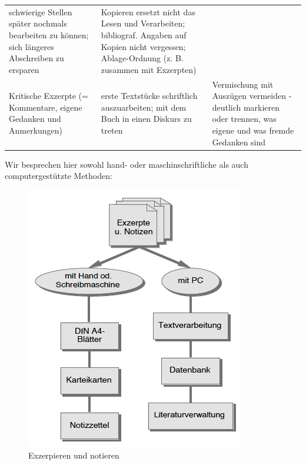 \documentclass[]{book}
\theoremstyle{definition}
\theoremstyle{definition}
\theoremstyle{definition}
\theoremstyle{remark}
\begin{document}
\begin{longtable}[]{@{}lll@{}}
\begin{minipage}[t]{0.27\columnwidth}
schwierige Stellen später nochmals bearbeiten zu können; sich längeres
Abschreiben zu ersparen \vspace{5mm}\strut
\end{minipage} & \begin{minipage}[t]{0.33\columnwidth}\raggedright\strut
Kopieren ersetzt nicht das Lesen und Verarbeiten; bibliograf. Angaben
auf Kopien nicht vergessen; Ablage-Ordnung (z. B. zusammen mit
Exzerpten) \vspace{5mm}\strut
\end{minipage}\tabularnewline
\begin{minipage}[t]{0.31\columnwidth}\raggedright\strut
Kritische Exzerpte (= Kommentare, eigene Gedanken und Anmerkungen)\strut
\end{minipage} & \begin{minipage}[t]{0.27\columnwidth}\raggedright\strut
erste Textstücke schriftlich auszuarbeiten; mit dem Buch in einen
Diskurs zu treten \vspace{5mm}\strut
\end{minipage} & \begin{minipage}[t]{0.33\columnwidth}\raggedright\strut
Vermischung mit Auszügen vermeiden - deutlich markieren oder trennen,
was eigene und was fremde Gedanken sind \vspace{5mm}\strut
\end{minipage}\tabularnewline
\bottomrule
\end{longtable}

Wir besprechen hier sowohl hand- oder maschinschriftliche als auch
computergestützte Methoden:

\begin{figure}

{\centering \includegraphics{images/lesen-notizen-min} 

}

\caption{Exzerpieren und notieren}\label{fig:unnamed-chunk-19}
\end{figure}
\end{document}

